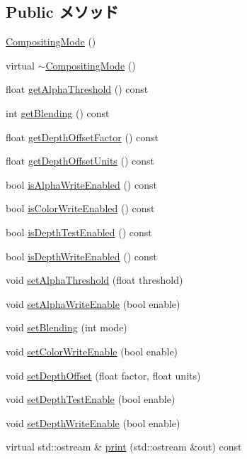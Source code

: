 \subsection*{Public メソッド}
\begin{CompactItemize}
\item 
\hyperlink{classm3g_1_1CompositingMode_5abfd1a798f1327aac4b92f55d4ecc0c}{CompositingMode} ()
\item 
virtual \hyperlink{classm3g_1_1CompositingMode_0bba5b15be7249e946c9aaf94631ce3b}{$\sim$CompositingMode} ()
\item 
float \hyperlink{classm3g_1_1CompositingMode_19ab71363ea77fa86aa6fafce87f06cb}{getAlphaThreshold} () const 
\item 
int \hyperlink{classm3g_1_1CompositingMode_078954de3d786bd11dc98b06f237bbbb}{getBlending} () const 
\item 
float \hyperlink{classm3g_1_1CompositingMode_d24a4116e72678164f31d7a48f74be6b}{getDepthOffsetFactor} () const 
\item 
float \hyperlink{classm3g_1_1CompositingMode_add4c6c3bc01c1d0689e0588af79039f}{getDepthOffsetUnits} () const 
\item 
bool \hyperlink{classm3g_1_1CompositingMode_bfcec134f769763d492011fc8ccadcce}{isAlphaWriteEnabled} () const 
\item 
bool \hyperlink{classm3g_1_1CompositingMode_35ffa21944393c774552003dd2cb03ea}{isColorWriteEnabled} () const 
\item 
bool \hyperlink{classm3g_1_1CompositingMode_4dd97b29a6e12c5e64477ab1546f93f1}{isDepthTestEnabled} () const 
\item 
bool \hyperlink{classm3g_1_1CompositingMode_0ee4c812abd4a99e0373158d36dc45d9}{isDepthWriteEnabled} () const 
\item 
void \hyperlink{classm3g_1_1CompositingMode_6becafaefd18a2b8b1adeba491576837}{setAlphaThreshold} (float threshold)
\item 
void \hyperlink{classm3g_1_1CompositingMode_5204f1acac056f82d322262703be67b0}{setAlphaWriteEnable} (bool enable)
\item 
void \hyperlink{classm3g_1_1CompositingMode_4c09465dfec9efa000c115c5c2867b63}{setBlending} (int mode)
\item 
void \hyperlink{classm3g_1_1CompositingMode_84f7cba08f5a2bea05de4fc3154a50b2}{setColorWriteEnable} (bool enable)
\item 
void \hyperlink{classm3g_1_1CompositingMode_4c825055ad0b5910ef4f9136d9a8e588}{setDepthOffset} (float factor, float units)
\item 
void \hyperlink{classm3g_1_1CompositingMode_5f1afccdc51665bb04c971579d8ee05c}{setDepthTestEnable} (bool enable)
\item 
void \hyperlink{classm3g_1_1CompositingMode_a3275c9589ef319c6ba6f5c22d0b2860}{setDepthWriteEnable} (bool enable)
\item 
virtual std::ostream \& \hyperlink{classm3g_1_1CompositingMode_6fea17fa1532df3794f8cb39cb4f911f}{print} (std::ostream \&out) const 
\end{CompactItemize}
